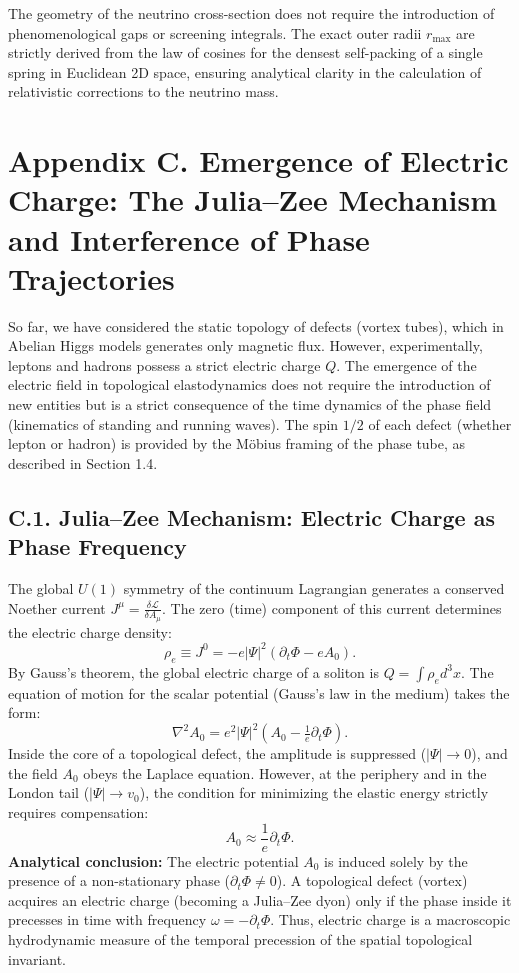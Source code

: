 \documentclass[11pt,a4paper]{article}
\begin{document}
The geometry of the neutrino cross-section does not require the introduction of phenomenological gaps or screening integrals. The exact outer radii $r_{\text{max}}$ are strictly derived from the law of cosines for the densest self-packing of a single spring in Euclidean 2D space, ensuring analytical clarity in the calculation of relativistic corrections to the neutrino mass.

\section*{Appendix C. Emergence of Electric Charge: The Julia–Zee Mechanism and Interference of Phase Trajectories}

So far, we have considered the static topology of defects (vortex tubes), which in Abelian Higgs models generates only magnetic flux. However, experimentally, leptons and hadrons possess a strict electric charge $Q$. The emergence of the electric field in topological elastodynamics does not require the introduction of new entities but is a strict consequence of the time dynamics of the phase field (kinematics of standing and running waves). The spin $1/2$ of each defect (whether lepton or hadron) is provided by the Möbius framing of the phase tube, as described in Section 1.4.

\subsection*{C.1. Julia–Zee Mechanism: Electric Charge as Phase Frequency}
The global $U(1)$ symmetry of the continuum Lagrangian generates a conserved Noether current $J^\mu = \frac{\delta \mathcal{L}}{\delta A_\mu}$. The zero (time) component of this current determines the electric charge density:
\begin{equation}
\rho_e \equiv J^0 = -e |\Psi|^2 (\partial_t \Phi - e A_0).
\end{equation}
By Gauss's theorem, the global electric charge of a soliton is $Q = \int \rho_e d^3x$. The equation of motion for the scalar potential (Gauss's law in the medium) takes the form:
\begin{equation}
\nabla^2 A_0 = e^2 |\Psi|^2 (A_0 - \tfrac{1}{e}\partial_t \Phi).
\end{equation}
Inside the core of a topological defect, the amplitude is suppressed ($|\Psi| \to 0$), and the field $A_0$ obeys the Laplace equation. However, at the periphery and in the London tail ($|\Psi| \to v_0$), the condition for minimizing the elastic energy strictly requires compensation:
\begin{equation}
A_0 \approx \frac{1}{e} \partial_t \Phi.
\end{equation}
\textbf{Analytical conclusion:} The electric potential $A_0$ is induced solely by the presence of a non-stationary phase ($\partial_t \Phi \neq 0$). A topological defect (vortex) acquires an electric charge (becoming a Julia–Zee dyon) only if the phase inside it precesses in time with frequency $\omega = -\partial_t \Phi$. Thus, electric charge is a macroscopic hydrodynamic measure of the temporal precession of the spatial topological invariant.
\end{document}
